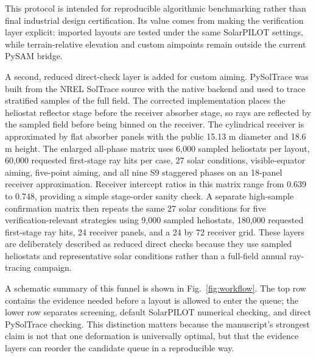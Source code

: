 \documentclass[final,3p,times]{elsarticle}
\begin{document}
This protocol is intended for reproducible algorithmic benchmarking rather than final industrial design certification. Its value comes from making the verification layer explicit: imported layouts are tested under the same SolarPILOT settings, while terrain-relative elevation and custom aimpoints remain outside the current PySAM bridge.

A second, reduced direct-check layer is added for custom aiming. PySolTrace was built from the NREL SolTrace source with the native  backend and used to trace stratified samples of the full field. The corrected implementation places the heliostat reflector stage before the receiver absorber stage, so rays are reflected by the sampled field before being binned on the receiver. The cylindrical receiver is approximated by flat absorber panels with the public 15.13 m diameter and 18.6 m height. The enlarged all-phase matrix uses 6,000 sampled heliostats per layout, 60,000 requested first-stage ray hits per case, 27 solar conditions, visible-equator aiming, five-point aiming, and all nine S9 staggered phases on an 18-panel receiver approximation. Receiver intercept ratios in this matrix range from 0.639 to 0.748, providing a simple stage-order sanity check. A separate high-sample confirmation matrix then repeats the same 27 solar conditions for five verification-relevant strategies using 9,000 sampled heliostats, 180,000 requested first-stage ray hits, 24 receiver panels, and a 24 by 72 receiver grid. These layers are deliberately described as reduced direct checks because they use sampled heliostats and representative solar conditions rather than a full-field annual ray-tracing campaign.

A schematic summary of this funnel is shown in Fig.~\ref{fig:workflow}. The top row contains the evidence needed before a layout is allowed to enter the queue; the lower row separates screening, default SolarPILOT numerical checking, and direct PySolTrace checking. This distinction matters because the manuscript's strongest claim is not that one deformation is universally optimal, but that the evidence layers can reorder the candidate queue in a reproducible way.
\end{document}

